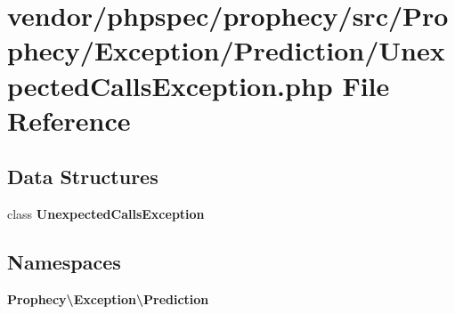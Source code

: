 \section{vendor/phpspec/prophecy/src/\+Prophecy/\+Exception/\+Prediction/\+Unexpected\+Calls\+Exception.php File Reference}
\label{_unexpected_calls_exception_8php}
\subsection*{Data Structures}
\begin{DoxyCompactItemize}
\item 
class {\bf Unexpected\+Calls\+Exception}
\end{DoxyCompactItemize}
\subsection*{Namespaces}
\begin{DoxyCompactItemize}
\item 
 {\bf Prophecy\textbackslash{}\+Exception\textbackslash{}\+Prediction}
\end{DoxyCompactItemize}
